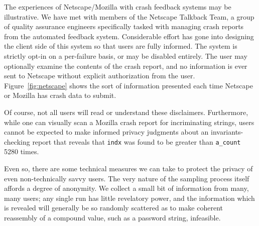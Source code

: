 The experiences of Netscape/Mozilla with crash feedback systems may be
illustrative.  We have met with members of the Netscape Talkback Team,
a group of quality assurance engineers specifically tasked with
managing crash reports from the automated feedback system.
Considerable effort has gone into designing the client side of this
system so that users are fully informed.  The system is strictly
opt-in on a per-failure basis, or may be disabled entirely.  The user
may optionally examine the contents of the crash report, and no
information is ever sent to Netscape without explicit authorization
from the user.  Figure~\ref{fig:netscape} shows the sort of
information presented each time Netscape or Mozilla has crash data to
submit.

Of course, not all users will read or understand these disclaimers.
Furthermore, while one can visually scan a Mozilla crash report for
incriminating strings, users cannot be expected to make informed
privacy judgments about an invariants-checking report that reveals
that \texttt{indx} was found to be greater than \texttt{a_count} 5280
times.

Even so, there are some technical measures we can take to protect the
privacy of even non-technically savvy users.  The very nature of the
sampling process itself affords a degree of anonymity.  We collect a
small bit of information from many, many users; any single run has
little revelatory power, and the information which is revealed will
generally be so randomly scattered as to make coherent reassembly of a
compound value, such as a password string, infeasible.




